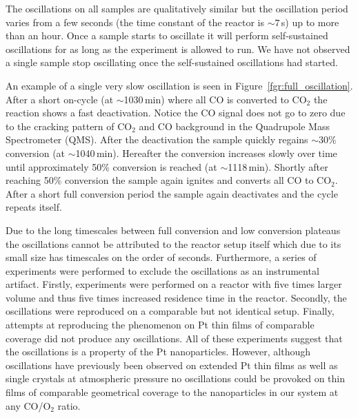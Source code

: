 \documentclass[journal=jacsat,manuscript=article]{achemso}
\begin{document}
The oscillations on all samples are qualitatively similar but the oscillation
period varies from a few seconds (the time constant of the reactor is
$\sim7\,$s) up to more than an hour. Once a sample starts to oscillate it will
perform self-sustained oscillations for as long as the experiment is allowed to
run. We have not observed a single sample stop oscillating once the self-sustained oscillations had started.

An example of a single very slow oscillation is seen in
Figure~\ref{fgr:full_oscillation}. After a short on-cycle (at $\sim$1030\,min) where
all CO is converted to CO$_2$ the reaction shows a fast deactivation. 
Notice the CO signal does not go to zero due to the cracking pattern of
CO$_2$ and CO background in the Quadrupole Mass Spectrometer (QMS).
After the deactivation the sample quickly regains
$\sim$30\% conversion (at $\sim$1040\,min). Hereafter the conversion increases
slowly over time until approximately 50\% conversion is reached (at
$\sim$1118\,min). Shortly after reaching 50\% conversion the sample again
ignites and converts all CO to CO$_2$. After a short full conversion period the
sample again deactivates and the cycle repeats itself.

Due to the long timescales between full conversion and low conversion plateaus
the oscillations cannot be attributed to the reactor setup itself which due to
its small size has timescales on the order of seconds. Furthermore, a series of
experiments were performed to exclude the oscillations as an instrumental
artifact. Firstly, experiments were performed on a reactor with five times larger volume and thus
five times increased residence time in the reactor. Secondly, the oscillations were
reproduced on a comparable but not identical setup. Finally, attempts at
reproducing the phenomenon on Pt thin films of comparable coverage did not
produce any oscillations. All of these experiments suggest that the
oscillations is a property of the Pt nanoparticles. However, 
although oscillations have previously been observed on extended Pt thin films
\cite{Singh2010} as well as single crystals\cite{Hendriksen2005} at atmospheric
pressure no oscillations could be provoked on thin films of comparable
geometrical coverage to the nanoparticles in our system at any CO/O$_2$ ratio.
\end{document}
